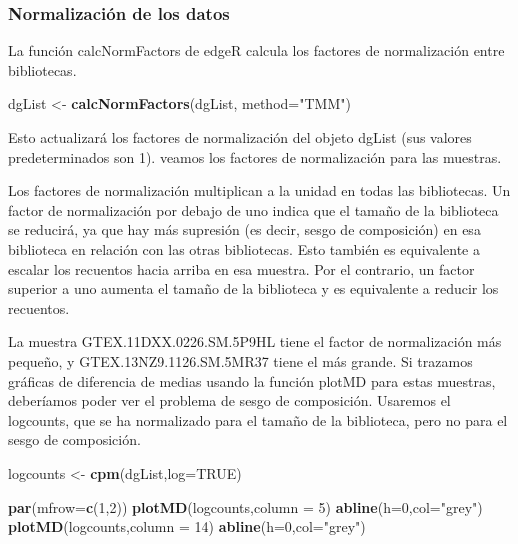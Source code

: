\documentclass[
]{article}
\newenvironment{Shaded}{\begin{snugshade}}{\end{snugshade}}
\newcommand{\DataTypeTok}[1]{\textcolor[rgb]{0.13,0.29,0.53}{#1}}
\newcommand{\DecValTok}[1]{\textcolor[rgb]{0.00,0.00,0.81}{#1}}
\newcommand{\KeywordTok}[1]{\textcolor[rgb]{0.13,0.29,0.53}{\textbf{#1}}}
\newcommand{\NormalTok}[1]{#1}
\newcommand{\OtherTok}[1]{\textcolor[rgb]{0.56,0.35,0.01}{#1}}
\newcommand{\StringTok}[1]{\textcolor[rgb]{0.31,0.60,0.02}{#1}}
\begin{document}
\hypertarget{normalizaciuxf3n-de-los-datos}{%
\subsubsection{Normalización de los
datos}\label{normalizaciuxf3n-de-los-datos}}

La función calcNormFactors de edgeR calcula los factores de
normalización entre bibliotecas.

\begin{Shaded}
\begin{Highlighting}[]
\NormalTok{dgList <-}\StringTok{ }\KeywordTok{calcNormFactors}\NormalTok{(dgList, }\DataTypeTok{method=}\StringTok{"TMM"}\NormalTok{)}
\end{Highlighting}
\end{Shaded}

Esto actualizará los factores de normalización del objeto dgList (sus
valores predeterminados son 1). veamos los factores de normalización
para las muestras.

Los factores de normalización multiplican a la unidad en todas las
bibliotecas. Un factor de normalización por debajo de uno indica que el
tamaño de la biblioteca se reducirá, ya que hay más supresión (es decir,
sesgo de composición) en esa biblioteca en relación con las otras
bibliotecas. Esto también es equivalente a escalar los recuentos hacia
arriba en esa muestra. Por el contrario, un factor superior a uno
aumenta el tamaño de la biblioteca y es equivalente a reducir los
recuentos.

La muestra GTEX.11DXX.0226.SM.5P9HL tiene el factor de normalización más
pequeño, y GTEX.13NZ9.1126.SM.5MR37 tiene el más grande. Si trazamos
gráficas de diferencia de medias usando la función plotMD para estas
muestras, deberíamos poder ver el problema de sesgo de composición.
Usaremos el logcounts, que se ha normalizado para el tamaño de la
biblioteca, pero no para el sesgo de composición.

\begin{Shaded}
\begin{Highlighting}[]
\NormalTok{logcounts <-}\StringTok{ }\KeywordTok{cpm}\NormalTok{(dgList,}\DataTypeTok{log=}\OtherTok{TRUE}\NormalTok{)}

\KeywordTok{par}\NormalTok{(}\DataTypeTok{mfrow=}\KeywordTok{c}\NormalTok{(}\DecValTok{1}\NormalTok{,}\DecValTok{2}\NormalTok{))}
\KeywordTok{plotMD}\NormalTok{(logcounts,}\DataTypeTok{column =} \DecValTok{5}\NormalTok{)}
\KeywordTok{abline}\NormalTok{(}\DataTypeTok{h=}\DecValTok{0}\NormalTok{,}\DataTypeTok{col=}\StringTok{"grey"}\NormalTok{)}
\KeywordTok{plotMD}\NormalTok{(logcounts,}\DataTypeTok{column =} \DecValTok{14}\NormalTok{)}
\KeywordTok{abline}\NormalTok{(}\DataTypeTok{h=}\DecValTok{0}\NormalTok{,}\DataTypeTok{col=}\StringTok{"grey"}\NormalTok{)}
\end{Highlighting}
\end{Shaded}
\end{document}
